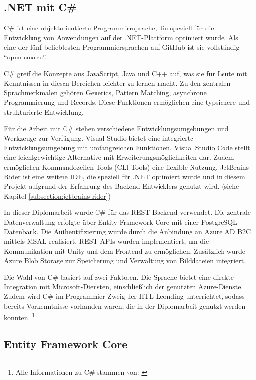 \subsection{.NET mit C\#}

C\# ist eine objektorientierte Programmiersprache, die speziell für die Entwicklung von 
Anwendungen auf der .NET-Plattform optimiert wurde. Als eine der fünf beliebtesten 
Programmiersprachen auf GitHub ist sie vollständig ``open-source''.

C\# greif die Konzepte aus JavaScript, Java und C++ auf, was sie für Leute mit Kenntnissen
in diesen Bereichen leichter zu lernen macht. Zu den zentralen Sprachmerkmalen gehören Generics, 
Pattern Matching, asynchrone Programmierung und Records. Diese Funktionen ermöglichen eine 
typsichere und strukturierte Entwicklung.

Für die Arbeit mit C\# stehen verschiedene Entwicklungsumgebungen und Werkzeuge zur Verfügung. 
Visual Studio bietet eine integrierte Entwicklungsumgebung mit umfangreichen Funktionen. 
Visual Studio Code stellt eine leichtgewichtige Alternative mit Erweiterungsmöglichkeiten 
dar. Zudem ermöglichen Kommandozeilen-Tools (CLI-Tools) eine flexible Nutzung. JetBrains Rider 
ist eine weitere IDE, die speziell für .NET optimiert wurde und in diesem Projekt
aufgrund der Erfahrung des Backend-Entwicklers genutzt wird. (siehe Kapitel \ref{subsection:jetbrains-rider})

In dieser Diplomarbeit wurde C\# für das REST-Backend verwendet. Die zentrale Datenverwaltung 
erfolgte über Entity Framework Core mit einer PostgreSQL-Datenbank. Die Authentifizierung 
wurde durch die Anbindung an Azure AD B2C mittels MSAL realisiert. REST-APIs wurden implementiert, 
um die Kommunikation mit Unity und dem Frontend zu ermöglichen. Zusätzlich wurde Azure Blob 
Storage zur Speicherung und Verwaltung von Bilddateien integriert.

Die Wahl von C\# basiert auf zwei Faktoren. Die Sprache bietet eine direkte Integration mit 
Microsoft-Diensten, einschließlich der genutzten Azure-Dienste. Zudem wird C\# im 
Programmier-Zweig der HTL-Leonding unterrichtet, sodass bereits Vorkenntnisse vorhanden 
waren, die in der Diplomarbeit genutzt werden konnten.
\footnote{Alle Informationen zu C\# stammen von: \cite{MicrosoftCorporationo}}

\subsection{Entity Framework Core}


